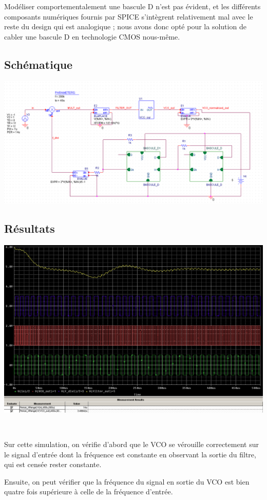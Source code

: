 \documentclass[11pt]{article}
\begin{document}
Modéliser comportementalement une bascule D n’est pas évident, et les différents composants numériques fournis par SPICE s’intègrent relativement mal avec le reste du design qui est analogique ; nous avons donc opté pour la solution de cabler une bascule D en technologie CMOS nous-même.

\subsection{Schématique}

\includegraphics[width=\linewidth]{multi_sch.png}

\subsection{Résultats}

\includegraphics[width=\linewidth]{multi_sim.png}

~

Sur cette simulation, on vérifie d’abord que le VCO se vérouille correctement sur le signal d’entrée dont la fréquence est constante en observant la sortie du filtre, qui est censée rester constante.

Ensuite, on peut vérifier que la fréquence du signal en sortie du VCO est bien quatre fois supérieure à celle de la fréquence d’entrée.
\end{document}

